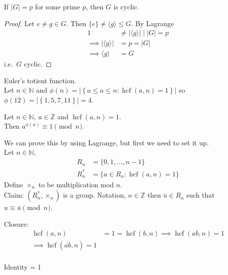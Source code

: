 \begin{corollary}
\protect\hypertarget{cor:three}{}\label{cor:three}If \(|G| = p\) for some prime \(p\), then \(G\) is cyclic.
\end{corollary}

\begin{proof}
Let \(e \neq g \in G\).
Then \(\{ e \} \neq \langle g \rangle \leq G\).
By Lagrange
\begin{align*}
    1 &\neq | \langle g \rangle | \;\bigg|\; |G| = p \\
    \implies | \langle g \rangle | &= p = |G| \\
    \implies \langle g \rangle &= G
\end{align*}
i.e.~\(G\) cyclic.
\end{proof}

Euler's totient function.\\
Let \(n \in \mathbb{N}\) and \(\phi(n) = \left| \left\{ a \leq a \leq n : \operatorname{hcf}(a, n) = 1 \right\} \right|\) so \(\phi(12) = \left| \left\{ 1, 5, 7, 11 \right\} \right| = 4\).

\begin{theorem}
\protect\hypertarget{thm:four}{}\label{thm:four}Let \(n \in \mathbb{N},\ a \in \mathbb{Z}\) and \(\operatorname{hcf}(a, n) = 1\).\\
Then \(a^{\phi(n)} \equiv 1 \pmod n\).
\end{theorem}

We can prove this by using Lagrange, but first we need to set it up.\\
Let \(n \in \mathbb{N}\),
\begin{align*}
    R_n &= \{ 0, 1, \ldots, n-1 \} \\
    R_n^* &= \{ a \in R_n : \operatorname{hcf}(a, n) = 1 \}
\end{align*}
Define \(\times_n\) to be multiplication mod \(n\).\\
Claim: \((R_n^*, \times_n)\) is a group.
Notation, \(n \in \mathbb{Z}\) then \(\bar{u} \in R_n\) such that \(u \equiv \bar{u} \pmod n\).

Closure:
\begin{align*}
    \operatorname{hcf}(a, n) &= 1 = \operatorname{hcf}(b, n)
    \implies \operatorname{hcf}(ab, n) = 1 \\
    \implies \operatorname{hcf}(\bar{ab}, n) = 1 \\
\end{align*}

Identity = 1

